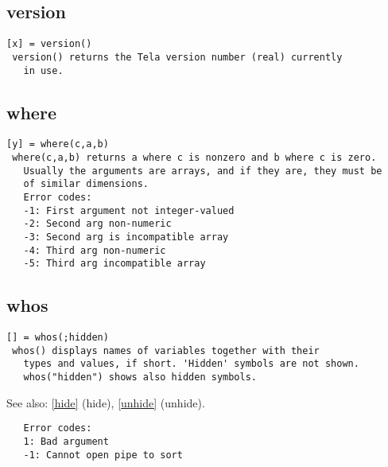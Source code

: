 \documentclass[a4paper]{article}
\begin{document}
\subsection{version\label{version}}

\begin{tscreen}
\begin{verbatim}
[x] = version()
 version() returns the Tela version number (real) currently
   in use. 
\end{verbatim}
\end{tscreen}



\subsection{where\label{where}}

\begin{tscreen}
\begin{verbatim}
[y] = where(c,a,b)
 where(c,a,b) returns a where c is nonzero and b where c is zero.
   Usually the arguments are arrays, and if they are, they must be
   of similar dimensions.
   Error codes:
   -1: First argument not integer-valued
   -2: Second arg non-numeric
   -3: Second arg is incompatible array
   -4: Third arg non-numeric
   -5: Third arg incompatible array
\end{verbatim}
\end{tscreen}



\subsection{whos\label{whos}}

\begin{tscreen}
\begin{verbatim}
[] = whos(;hidden)
 whos() displays names of variables together with their
   types and values, if short. 'Hidden' symbols are not shown.
   whos("hidden") shows also hidden symbols.
\end{verbatim}

See also: \ref{hide} {(hide)}, \ref{unhide} {(unhide)}.
\begin{verbatim}
   Error codes:
   1: Bad argument
   -1: Cannot open pipe to sort
   
\end{verbatim}
\end{tscreen}
\end{document}
